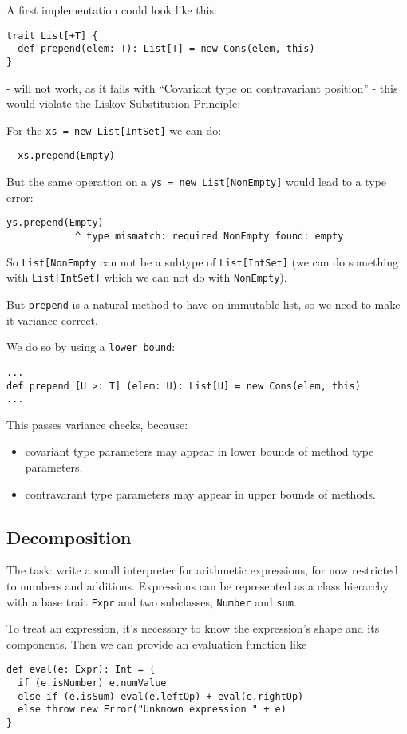 \documentclass{scrartcl}
\newcommand{\term}[1]{\verb~#1~} %
\begin{document}
A first implementation could look like this:
\begin{lstlisting}
trait List[+T] {
  def prepend(elem: T): List[T] = new Cons(elem, this)
}
\end{lstlisting}
- will not work, as it fails with ``Covariant type on contravariant position'' -
this would violate the Liskov Substitution Principle:

For the \lstinline|xs = new List[IntSet]| we can do:
\begin{lstlisting}
  xs.prepend(Empty)
\end{lstlisting}

But the same operation on a \lstinline|ys = new List[NonEmpty]| would lead to a
type error:
\begin{lstlisting}
ys.prepend(Empty)
            ^ type mismatch: required NonEmpty found: empty
\end{lstlisting}
So \lstinline|List[NonEmpty| can not be a subtype of \lstinline|List[IntSet]|
(we can do something with \lstinline|List[IntSet]| which we can not do with
\lstinline|NonEmpty|).

But \lstinline|prepend| is a natural method to have on immutable list, so we
need to make it variance-correct.

We do so by using a \term{lower bound}:
\begin{lstlisting}
...
def prepend [U >: T] (elem: U): List[U] = new Cons(elem, this)
...
\end{lstlisting}
This passes variance checks, because:
\begin{itemize}
\item covariant type parameters may appear in lower bounds of method type
  parameters.
\item contravarant type parameters may appear in upper bounds of methods.
\end{itemize}

\subsection{Decomposition}
\label{sec:Decomposition}
The task: write a small interpreter for arithmetic expressions, for now
restricted to numbers and additions. Expressions can be represented as a class
hierarchy with a base trait \lstinline|Expr| and two subclasses,
\lstinline|Number| and \lstinline|sum|.

To treat an expression, it's necessary to know the expression's shape and its
components. Then we can provide an evaluation function like
\begin{lstlisting}
def eval(e: Expr): Int = {
  if (e.isNumber) e.numValue
  else if (e.isSum) eval(e.leftOp) + eval(e.rightOp)
  else throw new Error("Unknown expression " + e)
}
\end{lstlisting}
\end{document}
